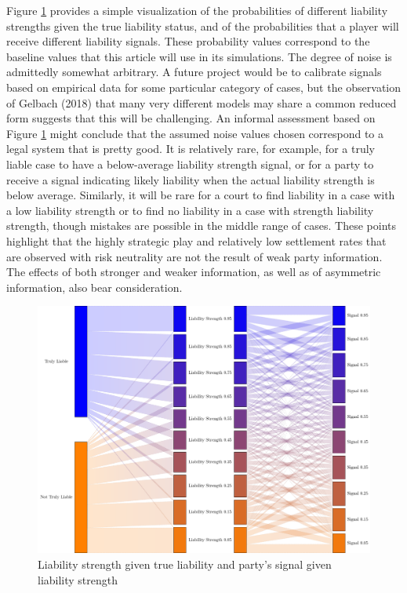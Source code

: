 \documentclass{article}
\begin{document}
Figure \ref{fig:liabilitysignalsdefault} provides a simple visualization of the probabilities of different liability strengths given the true liability status, and of the probabilities that a player will receive different liability signals. These probability values correspond to the baseline values that this article will use in its simulations. The degree of noise is admittedly somewhat arbitrary. A future project would be to calibrate signals based on empirical data for some particular category of cases, but the observation of Gelbach (2018) \cite{gelbach} that many very different models may share a common reduced form suggests that this will be challenging. An informal assessment based on Figure \ref{fig:liabilitysignalsdefault} might conclude that the assumed noise values chosen correspond to a legal system that is pretty good. It is relatively rare, for example, for a truly liable case to have a below-average liability strength signal, or for a party to receive a signal indicating likely liability when the actual liability strength is below average. Similarly, it will be rare for a court to find liability in a case with a low liability strength or to find no liability in a case with strength liability strength, though mistakes are possible in the middle range of cases. These points highlight that the highly strategic play and relatively low settlement rates that are observed with risk neutrality are not the result of weak party information. The effects of both stronger and weaker information, as well as of asymmetric information, also bear consideration.

\begin{figure}[h!]
\centering
\includegraphics[scale=0.4, trim={0in 0in 0in 0in}, clip]{../Figures/liability signals default.pdf}
\caption{Liability strength given true liability and party's signal given liability strength}
\label{fig:liabilitysignalsdefault}
\end{figure}
\end{document}
